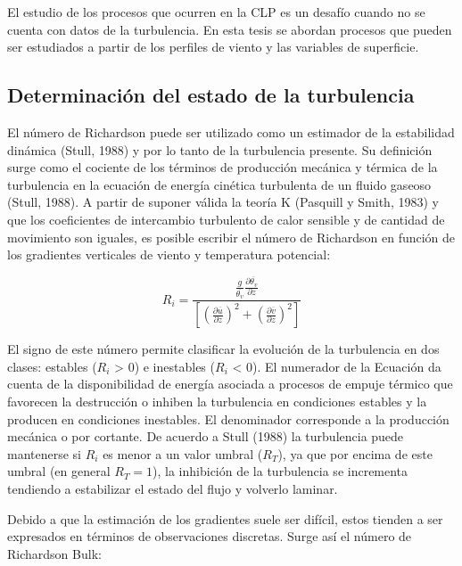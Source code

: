 \documentclass[12pt,spanish,oneside, a4paper]{book}
\begin{document}
El estudio de los procesos que ocurren en la CLP es un desafío cuando no
se cuenta con datos de la turbulencia. En esta tesis se abordan procesos
que pueden ser estudiados a partir de los perfiles de viento y las
variables de superficie.

\subsection{Determinación del estado de la
turbulencia}\label{determinacion-del-estado-de-la-turbulencia}

El número de Richardson puede ser utilizado como un estimador de la
estabilidad dinámica (Stull, 1988) y por lo tanto de la turbulencia
presente. Su definición surge como el cociente de los términos de
producción mecánica y térmica de la turbulencia en la ecuación de
energía cinética turbulenta de un fluido gaseoso (Stull, 1988). A partir
de suponer válida la teoría K (Pasquill y Smith, 1983) y que los
coeficientes de intercambio turbulento de calor sensible y de cantidad
de movimiento son iguales, es posible escribir el número de Richardson
en función de los gradientes verticales de viento y temperatura
potencial:

\begin{equation} \label{eq-ri1}
R_i = \frac{\frac{g}{\overline{\theta_v}} \frac{\partial \overline{\theta_v}}{\partial z}}
{\left [ \left (\frac{\partial \overline{u}}{\partial z} \right )^2 + \left (\frac{\partial \overline{v}}{\partial z} \right )^2  \right]}
\end{equation}

El signo de este número permite clasificar la evolución de la
turbulencia en dos clases: estables (\(R_i\) \textgreater{} 0) e
inestables (\(R_i\) \textless{} 0). El numerador de la Ecuación da
cuenta de la disponibilidad de energía asociada a procesos de empuje
térmico que favorecen la destrucción o inhiben la turbulencia en
condiciones estables y la producen en condiciones inestables. El
denominador corresponde a la producción mecánica o por cortante. De
acuerdo a Stull (1988) la turbulencia puede mantenerse si \(R_i\) es
menor a un valor umbral (\(R_T\)), ya que por encima de este umbral (en
general \(R_T = 1\)), la inhibición de la turbulencia se incrementa
tendiendo a estabilizar el estado del flujo y volverlo laminar.

Debido a que la estimación de los gradientes suele ser difícil, estos
tienden a ser expresados en términos de observaciones discretas. Surge
así el número de Richardson Bulk:
\end{document}
